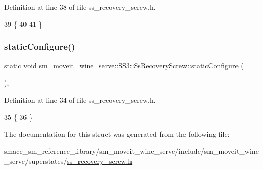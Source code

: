 Definition at line 38 of file ss\+\_\+recovery\+\_\+screw.\+h.


\begin{DoxyCode}
39             \{
40                 
41             \}
\end{DoxyCode}
\mbox{\label{structsm__moveit__wine__serve_1_1SS3_1_1SsRecoveryScrew_a8abad53b2989f3d9063e268b95874401}} 
\subsubsection{\texorpdfstring{static\+Configure()}{staticConfigure()}}
{\footnotesize\ttfamily static void sm\+\_\+moveit\+\_\+wine\+\_\+serve\+::\+S\+S3\+::\+Ss\+Recovery\+Screw\+::static\+Configure (\begin{DoxyParamCaption}{ }\end{DoxyParamCaption})\hspace{0.3cm}{\ttfamily [inline]}, {\ttfamily [static]}}



Definition at line 34 of file ss\+\_\+recovery\+\_\+screw.\+h.


\begin{DoxyCode}
35             \{
36             \}
\end{DoxyCode}


The documentation for this struct was generated from the following file\+:\begin{DoxyCompactItemize}
\item 
smacc\+\_\+sm\+\_\+reference\+\_\+library/sm\+\_\+moveit\+\_\+wine\+\_\+serve/include/sm\+\_\+moveit\+\_\+wine\+\_\+serve/superstates/\hyperlink{sm__moveit__wine__serve_2include_2sm__moveit__wine__serve_2superstates_2ss__recovery__screw_8h}{ss\+\_\+recovery\+\_\+screw.\+h}\end{DoxyCompactItemize}
